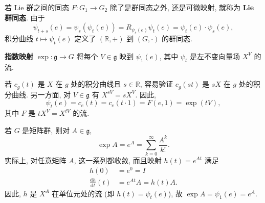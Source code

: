 \begin{RiemannRemark}\label{rem:one-parameter-lie-group-homomorphism}
若 Lie 群之间的同态 $F:G_1\to G_2$ 除了是群同态之外, 还是可微映射, 就称为 \textbf{Lie 群同态}. 由于
\[
  \psi_{t+s}(e)=\psi_s(\psi_t(e))=R_{\psi_s(e)}\psi_t(e)=\psi_t(e)\cdot\psi_s(e),
\]
积分曲线 $t\mapsto\psi_t(e)$ 定义了 $(\mathbb{R},+)$ 到 $(G,\cdot)$ 的群同态.
\end{RiemannRemark}

\begin{RiemannDefinition}\label{def:lie-group-exponential-map}
\textbf{指数映射} $\exp:\mathfrak g\to G$ 将每个 $V\in\mathfrak g$ 映到 $\psi_1(e)$, 其中 $\psi_t$ 是左不变向量场 $X^V$ 的流.
\end{RiemannDefinition}

\begin{RiemannRemark}\label{rem:one-parameter-subgroup-via-exponential}
若 $c_g(t)$ 是 $X$ 在 $g$ 处的积分曲线且 $s\in\mathbb{R}$, 容易验证 $c_g(st)$ 是 $sX$ 在 $g$ 处的积分曲线. 另一方面, 对 $V\in\mathfrak g$ 有 $X^{sV}=sX^V$. 因此,
\[
  \psi_t(e)=c_e(t)=c_e(t\cdot 1)=F(e,1)=\exp(tV),
\]
其中 $F$ 是 $tX^V=X^{tV}$ 的流.
\end{RiemannRemark}

\begin{RiemannExample}\label{ex:matrix-lie-group-exponential}
若 $G$ 是矩阵群, 则对 $A\in\mathfrak g$,
\[
  \exp A=e^A=\sum_{k=0}^{\infty}\frac{A^k}{k!}.
\]
实际上, 对任意矩阵 $A$, 这一系列都收敛, 而且映射 $h(t)=e^{At}$ 满足
\begin{align*}
  h(0)&=e^0=I\\
  \frac{\mathrm{d}h}{\mathrm{d}t}(t)&=e^{At}A=h(t)A.
\end{align*}
因此, $h$ 是 $X^A$ 在单位元处的流 (即 $h(t)=\psi_t(e)$), 故 $\exp A=\psi_1(e)=e^A$.
\end{RiemannExample}



